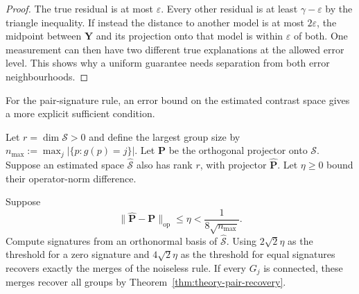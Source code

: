 \begin{proof}
    The true residual is at most $\varepsilon$.
    Every other residual is at least $\gamma-\varepsilon$
    by the triangle inequality.
    If instead the distance to another model is at most
    $2\varepsilon$, the midpoint between $\mathbf Y$ and its
    projection onto that model is within $\varepsilon$ of both.
    One measurement can then have two different true explanations
    at the allowed error level. This shows why a uniform guarantee
    needs separation from both error neighbourhoods.
\end{proof}

For the pair-signature rule, an error bound on the estimated
contrast space gives a more explicit sufficient condition.


Let $r=\dim\mathcal S>0$ and define the largest group
size by
$n_{\max}:=\max_j|\{p:g(p)=j\}|$.
Let $\mathbf P$ be the orthogonal projector onto
$\mathcal S$.
Suppose an estimated space $\widehat{\mathcal S}$ also has rank $r$,
with projector $\widehat{\mathbf P}$.
Let $\eta\ge0$ bound their operator-norm difference.

\begin{proposition}
    \label{prop:theory-stable-pairs}
    Suppose
    \begin{equation}
        \|\widehat{\mathbf P}-\mathbf P\|_{\mathrm{op}}
        \le\eta<\frac1{8\sqrt{n_{\max}}}.
        \label{eq:appendix-theory-space-error}
    \end{equation}
    Compute signatures from an orthonormal basis of
    $\widehat{\mathcal S}$.
    Using $2\sqrt2\eta$ as the threshold for a zero signature and
    $4\sqrt2\eta$ as the threshold for equal signatures recovers
    exactly the merges of the noiseless rule.
    If every $G_j$ is connected, these merges recover all groups by
    Theorem~\ref{thm:theory-pair-recovery}.
\end{proposition}

